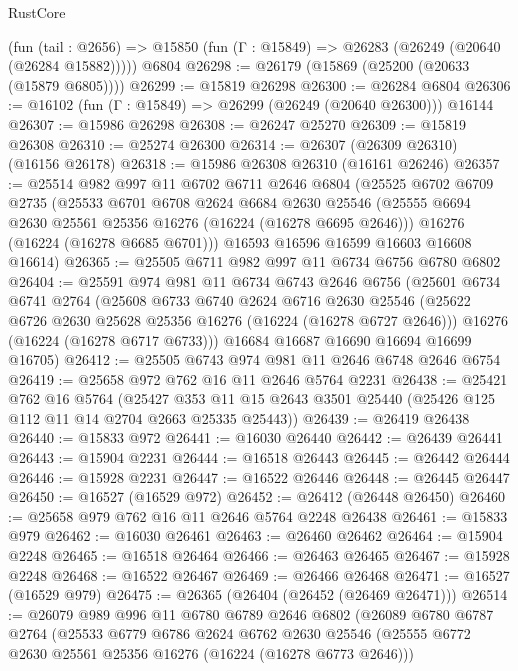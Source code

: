 \begin{lexlean}{RustCore}
\begin{coremodule}
    (fun (tail : @2656) => @15850 (fun (Γ : @15849) => @26283 (@26249 (@20640 (@26284 @15882)))))
    @6804
@26298 := @26179 (@15869 (@25200 (@20633 (@15879 @6805))))
@26299 := @15819 @26298
@26300 := @26284 @6804
@26306 := @16102 (fun (Γ : @15849) => @26299 (@26249 (@20640 @26300))) @16144
@26307 := @15986 @26298
@26308 := @26247 @25270
@26309 := @15819 @26308
@26310 := @25274 @26300
@26314 := @26307 (@26309 @26310) (@16156 @26178)
@26318 := @15986 @26308 @26310 (@16161 @26246)
@26357 := @25514
    @982
    @997
    @11
    @6702
    @6711
    @2646
    @6804
    (@25525
      @6702
      @6709
      @2735
      (@25533
        @6701
        @6708
        @2624
        @6684
        @2630
        @25546
        (@25555 @6694 @2630 @25561 @25356 @16276 (@16224 (@16278 @6695 @2646)))
        @16276
        (@16224 (@16278 @6685 @6701)))
      @16593
      @16596
      @16599
      @16603
      @16608
      @16614)
@26365 := @25505 @6711 @982 @997 @11 @6734 @6756 @6780 @6802
@26404 := @25591
    @974
    @981
    @11
    @6734
    @6743
    @2646
    @6756
    (@25601
      @6734
      @6741
      @2764
      (@25608
        @6733
        @6740
        @2624
        @6716
        @2630
        @25546
        (@25622 @6726 @2630 @25628 @25356 @16276 (@16224 (@16278 @6727 @2646)))
        @16276
        (@16224 (@16278 @6717 @6733)))
      @16684
      @16687
      @16690
      @16694
      @16699
      @16705)
@26412 := @25505 @6743 @974 @981 @11 @2646 @6748 @2646 @6754
@26419 := @25658 @972 @762 @16 @11 @2646 @5764 @2231
@26438 := @25421
    @762
    @16
    @5764
    (@25427 @353 @11 @15 @2643 @3501 @25440 (@25426 @125 @112 @11 @14 @2704 @2663 @25335 @25443))
@26439 := @26419 @26438
@26440 := @15833 @972
@26441 := @16030 @26440
@26442 := @26439 @26441
@26443 := @15904 @2231
@26444 := @16518 @26443
@26445 := @26442 @26444
@26446 := @15928 @2231
@26447 := @16522 @26446
@26448 := @26445 @26447
@26450 := @16527 (@16529 @972)
@26452 := @26412 (@26448 @26450)
@26460 := @25658 @979 @762 @16 @11 @2646 @5764 @2248 @26438
@26461 := @15833 @979
@26462 := @16030 @26461
@26463 := @26460 @26462
@26464 := @15904 @2248
@26465 := @16518 @26464
@26466 := @26463 @26465
@26467 := @15928 @2248
@26468 := @16522 @26467
@26469 := @26466 @26468
@26471 := @16527 (@16529 @979)
@26475 := @26365 (@26404 (@26452 (@26469 @26471)))
@26514 := @26079
    @989
    @996
    @11
    @6780
    @6789
    @2646
    @6802
    (@26089
      @6780
      @6787
      @2764
      (@25533
        @6779
        @6786
        @2624
        @6762
        @2630
        @25546
        (@25555 @6772 @2630 @25561 @25356 @16276 (@16224 (@16278 @6773 @2646)))

\end{coremodule}
\end{lexlean}

